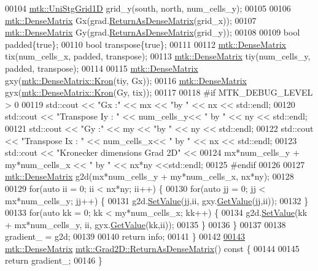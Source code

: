 \begin{DoxyCode}
00104   \hyperlink{classmtk_1_1UniStgGrid1D}{mtk::UniStgGrid1D} grid\_y(south, north, num\_cells\_y);
00105 
00106   \hyperlink{classmtk_1_1DenseMatrix}{mtk::DenseMatrix} Gx(grad.\hyperlink{classmtk_1_1Grad1D_a77b2eddbe4ab03f469306c604d505b1a}{ReturnAsDenseMatrix}(grid\_x));
00107   \hyperlink{classmtk_1_1DenseMatrix}{mtk::DenseMatrix} Gy(grad.\hyperlink{classmtk_1_1Grad1D_a77b2eddbe4ab03f469306c604d505b1a}{ReturnAsDenseMatrix}(grid\_y));
00108 
00109   \textcolor{keywordtype}{bool} padded\{\textcolor{keyword}{true}\};
00110   \textcolor{keywordtype}{bool} transpose\{\textcolor{keyword}{true}\};
00111 
00112   \hyperlink{classmtk_1_1DenseMatrix}{mtk::DenseMatrix} tix(num\_cells\_x, padded, transpose);
00113   \hyperlink{classmtk_1_1DenseMatrix}{mtk::DenseMatrix} tiy(num\_cells\_y, padded, transpose);
00114 
00115   \hyperlink{classmtk_1_1DenseMatrix}{mtk::DenseMatrix} gxy(\hyperlink{classmtk_1_1DenseMatrix_a01d3d8bd502870f93bf3a88a0cc5fb49}{mtk::DenseMatrix::Kron}(tiy, Gx));
00116   \hyperlink{classmtk_1_1DenseMatrix}{mtk::DenseMatrix} gyx(\hyperlink{classmtk_1_1DenseMatrix_a01d3d8bd502870f93bf3a88a0cc5fb49}{mtk::DenseMatrix::Kron}(Gy, tix));
00117 
00118 \textcolor{preprocessor}{  #if MTK\_DEBUG\_LEVEL > 0}
00119   std::cout << \textcolor{stringliteral}{"Gx :"} << mx << \textcolor{stringliteral}{"by "} << nx << std::endl;
00120   std::cout << \textcolor{stringliteral}{"Transpose Iy : "} << num\_cells\_y<< \textcolor{stringliteral}{" by "} << ny  << std::endl;
00121   std::cout << \textcolor{stringliteral}{"Gy :"} << my << \textcolor{stringliteral}{"by "} << ny << std::endl;
00122   std::cout << \textcolor{stringliteral}{"Transpose Ix : "} << num\_cells\_x<< \textcolor{stringliteral}{" by "} << nx  << std::endl;
00123   std::cout << \textcolor{stringliteral}{"Kronecker dimensions Grad 2D"} <<
00124     mx*num\_cells\_y + my*num\_cells\_x << \textcolor{stringliteral}{" by "} <<  nx*ny <<std::endl;
00125 \textcolor{preprocessor}{  #endif}
00126 
00127   \hyperlink{classmtk_1_1DenseMatrix}{mtk::DenseMatrix} g2d(mx*num\_cells\_y + my*num\_cells\_x, nx*ny);
00128 
00129   \textcolor{keywordflow}{for}(\textcolor{keyword}{auto} ii = 0; ii < nx*ny; ii++) \{
00130     \textcolor{keywordflow}{for}(\textcolor{keyword}{auto} jj = 0; jj < mx*num\_cells\_y; jj++) \{
00131       g2d.\hyperlink{classmtk_1_1DenseMatrix_a784ce5784109ac86bfb9d8562b334b13}{SetValue}(jj,ii, gxy.\hyperlink{classmtk_1_1DenseMatrix_a4b23ecbebd970b5eea915dbb50691024}{GetValue}(jj,ii));
00132     \}
00133     \textcolor{keywordflow}{for}(\textcolor{keyword}{auto} kk = 0; kk < my*num\_cells\_x; kk++) \{
00134       g2d.\hyperlink{classmtk_1_1DenseMatrix_a784ce5784109ac86bfb9d8562b334b13}{SetValue}(kk + mx*num\_cells\_y, ii, gyx.\hyperlink{classmtk_1_1DenseMatrix_a4b23ecbebd970b5eea915dbb50691024}{GetValue}(kk,ii));
00135     \}
00136   \}
00137 
00138   gradient\_ = g2d;
00139 
00140   \textcolor{keywordflow}{return} info;
00141 \}
00142 
\hypertarget{mtk__grad__2d_8cc_source_l00143}{}\hyperlink{classmtk_1_1Grad2D_a4f5a17519455f833bb70b8434c272312}{00143} \hyperlink{classmtk_1_1DenseMatrix}{mtk::DenseMatrix} \hyperlink{classmtk_1_1Grad2D_a4f5a17519455f833bb70b8434c272312}{mtk::Grad2D::ReturnAsDenseMatrix}()\textcolor{keyword}{ const }\{
00144 
00145   \textcolor{keywordflow}{return} gradient\_;
00146 \}
\end{DoxyCode}
